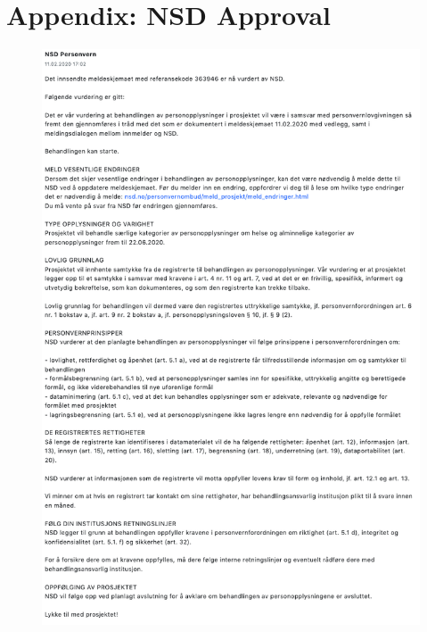 \chapter{Appendix: NSD Approval}

\begin{figure}
    \centering
    \includegraphics[width=1\textwidth]{images/NSDapproval.png}
\end{figure}
